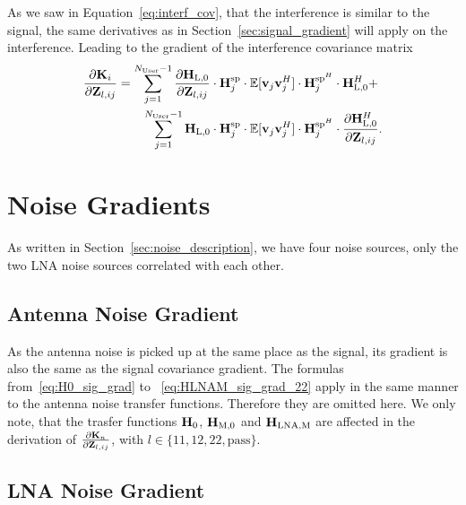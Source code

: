 As we saw in Equation~\eqref{eq:interf_cov}, that the interference is similar to the signal, the same derivatives as in Section~\ref{sec:signal_gradient} will apply on the interference.
Leading to the gradient of the interference covariance matrix
\begin{align}
\label{eq:interf_gradient}
\frac{\partial\mathbf{K}_i}{\partial\mathbf{Z}_{l,ij}} &= \sum_{j=1}^{N_\text{User}-1} 
	\frac{\partial\mathbf{H}_\text{L,0}}{\partial\mathbf{Z}_{l,ij}} \cdot \mathbf{H}_{j}^{\text{sp}} \cdot 
	\mathbb{E}[\mathbf{v}_{j}\mathbf{v}_{j}^H] \cdot 
	\mathbf{H}_{j}^{\text{sp}^H} \cdot \mathbf{H}_\text{L,0}^H + \\\nonumber
 &\qquad \sum_{j=1}^{N_\text{User}-1} 
	\mathbf{H}_\text{L,0} \cdot \mathbf{H}_{j}^{\text{sp}} \cdot 
	\mathbb{E}[\mathbf{v}_{j}\mathbf{v}_{j}^H] \cdot 
	\mathbf{H}_{j}^{\text{sp}^H} \cdot \frac{\partial\mathbf{H}_\text{L,0}^H}{\partial\mathbf{Z}_{l,ij}}.
\end{align}

\section{Noise Gradients}
\label{sec:noise_gradient}

As written in Section~\ref{sec:noise_description}, we have four noise sources, only the two LNA noise sources correlated with each other.

\subsection{Antenna Noise Gradient}
\label{sec:ant_noise_grad}
As the antenna noise is picked up at the same place as the signal, its gradient is also the same as the signal covariance gradient.
The formulas from~\eqref{eq:H0_sig_grad} to ~\eqref{eq:HLNAM_sig_grad_22} apply in the same manner to the antenna noise transfer functions.
Therefore they are omitted here.
We only note, that the trasfer functions $\mathbf{H}_{0}$, $\mathbf{H}_\text{M,0}$ and $\mathbf{H}_\text{LNA,M}$ are affected in the derivation of $\frac{\partial\mathbf{K}_n}{\partial\mathbf{Z}_{l,ij}}$, with $l\in\{11,12,22,\text{pass}\}$.

\subsection{LNA Noise Gradient}
\label{sec:lna_noise_grad}

